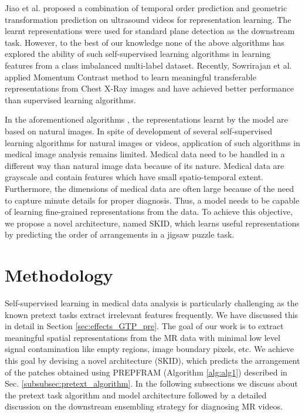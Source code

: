 \documentclass[journal]{IEEEtai}
\begin{document}
\indent
 Jiao et al. \cite{jnoble} proposed a combination of temporal order prediction and geometric transformation prediction on ultrasound videos for representation learning. The learnt representations were used for standard plane detection as the downstream task. However, to the best of our knowledge none of the above algorithms has explored the ability of such self-supervised learning algorithms in learning features from a class imbalanced multi-label dataset. Recently, Sowrirajan et al. \cite{mococxr} applied Momentum Contrast \cite{moco} method to learn meaningful transferable representations from Chest X-Ray images and have achieved better performance than supervised learning algorithms. 
 
 \indent
 In the aforementioned algorithms \cite{rotnet, imgcolor, shuffleandlearn, temporder, oddoneout, cliporder, sssptemporder, contextpred, jnoble}, the representations learnt by the model are based on natural images. In spite of development of several self-supervised learning algorithms for natural images or videos, application of such algorithms in medical image analysis remains limited. Medical data need to be handled in a different way than natural image data because of its nature. Medical data are grayscale and contain features which have small spatio-temporal extent. Furthermore, the dimensions of medical data are often large because of the need to capture minute details for proper diagnosis. Thus, a model needs to be capable of learning fine-grained representations from the data. To achieve this objective, we propose a novel architecture, named SKID, which learns useful representations by predicting the order of arrangements in a jigsaw puzzle task.

\section{Methodology}
\label{sec:methodology}
\indent
Self-supervised learning in medical data analysis is particularly challenging as the known pretext tasks extract irrelevant features frequently. We have discussed this in detail in Section \ref{sec:effects_GTP_pre}. The goal of our work is to extract meaningful spatial representations from the MR data with minimal low level signal contamination like empty regions, image boundary pixels, etc. We achieve this goal by devising a novel architecture (SKID), which predicts the arrangement of the patches obtained using PREPFRAM (Algorithm \ref{alg:alg1}) described in Sec. \ref{subsubsec:pretext_algorithm}. In the following subsections we discuss about the pretext task algorithm and model architecture followed by a detailed discussion on the downstream ensembling strategy for diagnosing MR videos. 
\end{document}
